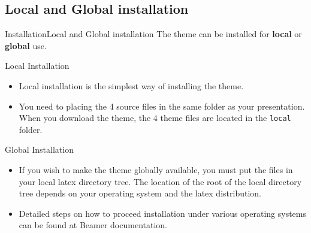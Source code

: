 \documentclass[10pt,xcolor={dvipsnames},aspectratio=169]{beamer}
\begin{document}
\subsection{Local and Global installation}
\begin{frame}{Installation}{Local and Global installation}
  The theme can be installed for \textbf{local} or \textbf{global} use.
  \pause
  \begin{block}{Local Installation}
  \begin{itemize}    
    \item Local installation is the simplest way of installing the theme. 
    \item You need to placing the 4 source files in the same folder as your presentation. When you download the theme, the 4 theme files are located in the {\tt local} folder.
  \end{itemize}
  \end{block}

  \begin{block}{Global Installation}
  \begin{itemize}
     \item If you wish to make the theme globally available, you must put the files in your local latex directory tree. The location of the root of the local directory tree depends on your operating system and the latex distribution. 
     \item Detailed steps on how to proceed installation under various operating systems can be found at Beamer documentation.
  \end{itemize}
  \end{block}
\end{frame}
     

\end{document}
